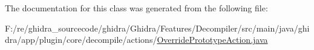 The documentation for this class was generated from the following file\+:\begin{DoxyCompactItemize}
\item 
F\+:/re/ghidra\+\_\+sourcecode/ghidra/\+Ghidra/\+Features/\+Decompiler/src/main/java/ghidra/app/plugin/core/decompile/actions/\mbox{\hyperlink{_override_prototype_action_8java}{Override\+Prototype\+Action.\+java}}\end{DoxyCompactItemize}

